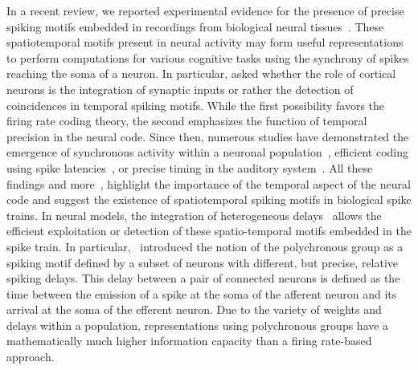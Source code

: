 \documentclass[default]{sn-jnl}%
\theoremstyle{thmstyleone}%
\theoremstyle{thmstyletwo}%
\theoremstyle{thmstylethree}%
\begin{document}
In a recent review, we reported experimental evidence for the presence of precise spiking motifs embedded in recordings from biological neural tissues~\cite{grimaldi_precise_2023}. These spatiotemporal motifs present in neural activity may form useful representations to perform computations for various cognitive tasks using the synchrony of spikes reaching the soma of a neuron. In particular, \citet{abeles_role_1982} asked whether the role of cortical neurons is the integration of synaptic inputs or rather the detection of coincidences in temporal spiking motifs. While the first possibility favors the firing rate coding theory, the second emphasizes the function of temporal precision in the neural code. Since then, numerous studies have demonstrated the emergence of synchronous activity within a neuronal population~\citep{riehle_spike_1997, davis_spontaneous_2021}, efficient coding using spike latencies~\citep{perrinet_coding_2004, gollisch_rapid_2008}, or precise timing in the auditory system~\citep{deweese_binary_2002, carr_circuit_1990}. All these findings and more~\citep{bohte_evidence_2004}, highlight the importance of the temporal aspect of the neural code and suggest the existence of spatiotemporal spiking motifs in biological spike trains. In neural models, the integration of heterogeneous delays~\citep{guise_bayesian_2014, zhang_supervised_2020, nadafian_bio-plausible_2020} allows the efficient exploitation or detection of these spatio-temporal motifs embedded in the spike train. In particular,~\citet{izhikevich_polychronization_2006} introduced the notion of the polychronous group as a spiking motif defined by a subset of neurons with different, but precise, relative spiking delays. This delay between a pair of connected neurons is defined as the time between the emission of a spike at the soma of the afferent neuron and its arrival at the soma of the efferent neuron. Due to the variety of weights and delays within a population, representations using polychronous groups have a mathematically much higher information capacity than a firing rate-based approach.
\end{document}
